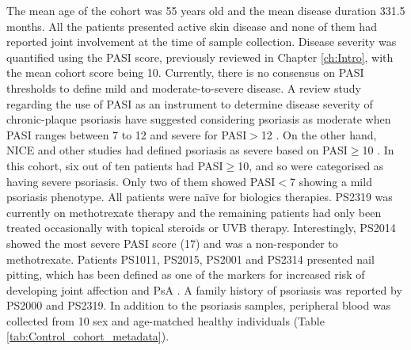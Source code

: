 The mean age of the cohort was 55 years old and the mean disease duration 331.5 months. All the patients presented active skin disease and none of them had reported joint involvement at the time of sample collection. Disease severity was quantified using the PASI score, previously reviewed in Chapter \ref{ch:Intro}, with the mean cohort score being 10. Currently, there is no consensus on PASI thresholds to define mild and moderate-to-severe disease. A review study regarding the use of PASI as an instrument to determine disease severity of chronic-plaque psoriasis have suggested considering psoriasis as moderate when PASI ranges between 7 to 12 and severe for PASI$>$12 \parencite{Schmitt2005}. On the other hand, NICE and other studies had defined psoriasis as severe based on PASI$\geq$10 \parencite{Woolacott2006, Finlay2005}. In this cohort, six out of ten patients had PASI$\geq$10, and so were categorised as having severe psoriasis. Only two of them showed PASI$<$7 showing a mild psoriasis phenotype. All patients were na\"{i}ve for biologics therapies. PS2319 was currently on methotrexate therapy and the remaining patients had only been treated occasionally with topical steroids or UVB therapy. Interestingly, PS2014 showed the most severe PASI score (17) and was a non-responder to methotrexate. Patients PS1011, PS2015, PS2001 and PS2314 presented nail pitting, which has been defined as one of the markers for increased risk of developing joint affection and PsA \parencite{Moll1973,Griffiths2007,McGonagle2011}. A family history of psoriasis was reported by PS2000 and PS2319. In addition to the psoriasis samples, peripheral blood was collected from 10 sex and age-matched healthy individuals (Table \ref{tab:Control_cohort_metadata}).




